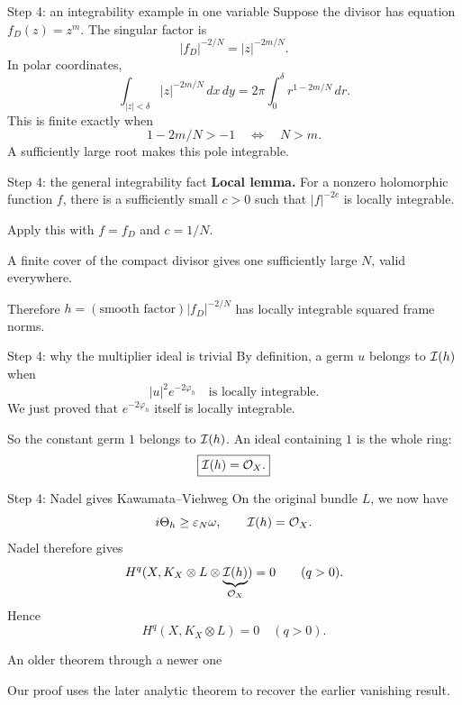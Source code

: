 \begin{frame}{Step 4: an integrability example in one variable}
Suppose the divisor has equation \(f_D(z)=z^m\). The singular factor is
\[
|f_D|^{-2/N}=|z|^{-2m/N}.
\]
In polar coordinates,
\[
\int_{|z|<\delta}|z|^{-2m/N}\,dx\,dy
=2\pi\int_0^\delta r^{1-2m/N}\,dr.
\]
This is finite exactly when
\[
1-2m/N>-1\quad\Longleftrightarrow\quad N>m.
\]
A sufficiently large root makes this pole integrable.
\end{frame}

\begin{frame}{Step 4: the general integrability fact}
\textbf{Local lemma.} For a nonzero holomorphic function \(f\), there is a sufficiently small \(c>0\) such that \(|f|^{-2c}\) is locally integrable.
\par\bigskip
Apply this with \(f=f_D\) and \(c=1/N\).
\par\medskip
A finite cover of the compact divisor gives one sufficiently large \(N\), valid everywhere.
\par\bigskip
Therefore \(h=(\text{smooth factor})|f_D|^{-2/N}\) has locally integrable squared frame norms.
\end{frame}

\begin{frame}{Step 4: why the multiplier ideal is trivial}
By definition, a germ \(u\) belongs to \(\mathcal I(h)\) when
\[
|u|^2e^{-2\varphi_h}\quad\text{is locally integrable}.
\]
We just proved that \(e^{-2\varphi_h}\) itself is locally integrable.
\par\medskip
So the constant germ \(1\) belongs to \(\mathcal I(h)\). An ideal containing \(1\) is the whole ring:
\[
\boxed{\mathcal I(h)=\mathcal O_X.}
\]
\end{frame}

\begin{frame}{Step 4: Nadel gives Kawamata--Viehweg}
On the original bundle \(L\), we now have
\[
i\Theta_h\ge\varepsilon_N\omega,\qquad\mathcal I(h)=\mathcal O_X.
\]
Nadel therefore gives
\[
H^q(X,K_X\otimes L\otimes\underbrace{\mathcal I(h)}_{\mathcal O_X})=0
\qquad(q>0).
\]
Hence
\[
\boxed{H^q(X,K_X\otimes L)=0\quad(q>0).}
\]
\end{frame}

\begin{frame}{An older theorem through a newer one}
\begin{center}
\end{center}
\par\bigskip
Our proof uses the later analytic theorem to recover the earlier vanishing result.
\end{frame}

